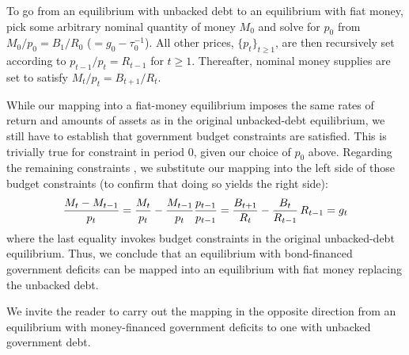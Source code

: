 To go from an equilibrium with unbacked debt to an equilibrium 
with fiat money, pick some arbitrary nominal quantity of 
money $M_0$ and solve for $p_0$ from $M_0/p_0=B_1/R_0$ ($= g_0-\tau^{-1}_0$). 
All other prices, $\{p_t\}_{t\geq 1}$, are then recursively set
according to $p_{t-1}/p_t=R_{t-1}$ for $t\geq 1$. Thereafter,
nominal money supplies are set to satisfy 
$M_t / p_t = B_{t+1} / R_t$.

While our mapping into a fiat-money equilibrium imposes the same 
rates of return and amounts of assets as in the original 
unbacked-debt equilibrium, we still have to establish that
government budget constraints  are satisfied. 
This is trivially true for constraint  in 
period $0$, given our choice of $p_0$ above. Regarding the 
remaining constraints , we substitute our 
mapping into the left side of those budget constraints
(to confirm that doing so yields the right side):
$${M_t - M_{t-1} \over p_t} = {M_t \over p_t} 
                            - {M_{t-1} \over p_t} {p_{t-1} \over p_{t-1}}
                            = {B_{t+1} \over R_t} 
                            - {B_t \over R_{t-1}}\,R_{t-1} 
                            = g_t 
$$
where the last equality invokes budget constraints 
 in the original unbacked-debt equilibrium.
Thus, we conclude that an equilibrium with bond-financed
government deficits can be mapped into an equilibrium with
fiat money replacing the unbacked debt. 

We invite the
reader to carry out the mapping in the opposite direction
from an equilibrium with money-financed government
deficits to one with unbacked government debt.


